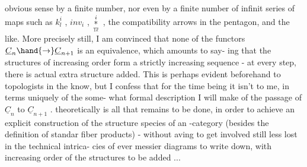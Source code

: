  

obvious sense by a finite number,  nor even by a finite number of infinit
series of maps such as $k^{i}_{l}$ , $inv_{i}$ , $\overset{i}{\underset{\over{1}{\ell}}{*}}$ , the compatibility arrows in
the pentagon,  and the like.  More precisely still,  I am convinced that
none of the functors $\underline{C}_{n} \hand{\to} \underline{C}_{n+1}$ is an equivalence,  which amounts to say-%
ing that  the structures of increasing order form a strictly increasing
sequence  -  at every step,  there is actual extra structure added.  This
is perhaps evident beforehand to topologists in the know,  but I confess
that for the time being it isn't to me,  in terms uniquely of the some-%
what formal description I will make of the passage of $\underline{C}_{n}$ to $\underline{C}_{n+1}$ .
  theoretically is all that remains to be done,  in order to achieve 
an explicit construction of the  structure species of an
\unsure{\hand{$\infty$}}-category  (besides the definition of standar fiber products)  -
without aving to get involved still less lost  in the technical intrica-%
cies of ever messier diagrams to write down,  with increasing order of
the structures to be added ...

